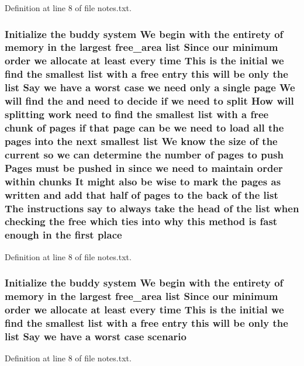 Definition at line 8 of file notes.\+txt.

\subsubsection[{\texorpdfstring{place}{place}}]{\setlength{\rightskip}{0pt plus 5cm}Initialize the buddy system We begin with the entirety of memory {\bf in} the largest {\bf free\+\_\+area} {\bf list} Since our minimum {\bf order} we allocate at least every time This {\bf is} the initial we find the smallest {\bf list} with a free entry this will be only the {\bf list} Say we have a worst case we need only a single {\bf page} We will find the and need to decide if we need to {\bf split} How will splitting work need to find the smallest {\bf list} with a free {\bf chunk} of {\bf pages} if that {\bf page} can be we need to load all the {\bf pages} into the next smallest {\bf list} We know the size of the current {\bf so} we can determine the number of {\bf pages} to push Pages must be pushed {\bf in} since we need to maintain {\bf order} within chunks It might also be wise to mark the {\bf pages} as written and add that half of {\bf pages} to the back of the {\bf list} The instructions say to always take the head of the {\bf list} when checking the free which ties into why this method {\bf is} fast enough {\bf in} the {\bf first} place}\hypertarget{notes_8txt_a8179423c2498b704bb92e1a1f67cfa3d}{}\label{notes_8txt_a8179423c2498b704bb92e1a1f67cfa3d}


Definition at line 8 of file notes.\+txt.

\subsubsection[{\texorpdfstring{scenario}{scenario}}]{\setlength{\rightskip}{0pt plus 5cm}Initialize the buddy system We begin with the entirety of memory {\bf in} the largest {\bf free\+\_\+area} {\bf list} Since our minimum {\bf order} we allocate at least every time This {\bf is} the initial we find the smallest {\bf list} with a free entry this will be only the {\bf list} Say we have a worst case scenario}\hypertarget{notes_8txt_a6b7da13421790a7ae65cd85c74905636}{}\label{notes_8txt_a6b7da13421790a7ae65cd85c74905636}


Definition at line 8 of file notes.\+txt.

